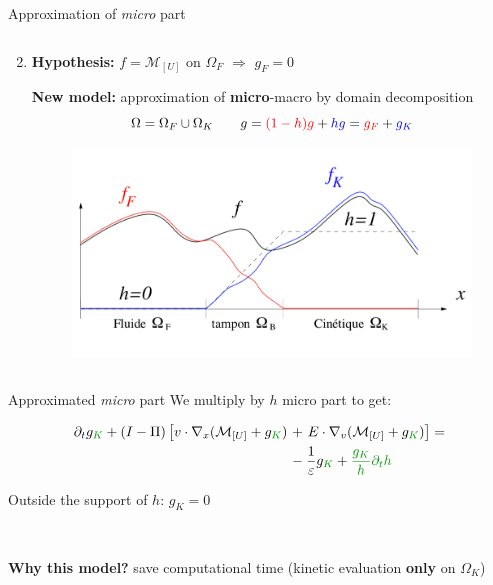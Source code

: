 \documentclass{beamer}
\begin{document}
  \begin{frame}{Approximation of \emph{micro} part}
    \begin{columns}
        \hspace*{0cm}
      \begin{column}{1.1\textwidth}
        \begin{enumerate}
          \setcounter{enumi}{1}
          \item \textbf{Hypothesis:} $f = \mathcal{M}_{[U]}$ on $\Omega_F$ $\Rightarrow$ $g_F = 0$

            \textbf{New model:} approximation of \textbf{micro}-macro by domain decomposition
            $$
              \Omega = \Omega_F \cup \Omega_K \qquad g = {\color{red}(1-h)g} + {\color{blue}hg} = {\color{red}g_F} + {\color{blue}g_K}
            $$

            \begin{figure}
              \centering
              \includegraphics[height=0.4\textheight]{img/hx.png}
            \end{figure}
        \end{enumerate}
      \end{column}
    \end{columns}  
  \end{frame}

  \begin{frame}{Approximated \emph{micro} part}
    We multiply by $h$ micro part to get:

    $$
      \begin{aligned}
        \partial_t g_{\color{dgreen}K} + (I-\Pi)\left[ v\cdot\nabla_x (\mathcal{M}_{[U]}+g_{\color{dgreen}K}) \right.&+\left. E\cdot\nabla_v (\mathcal{M}_{[U]}+g_{\color{dgreen}K}) \right] = \\
                                                                                      &-\frac{1}{\varepsilon}g_{\color{dgreen}K} + {\color{dgreen}\frac{g_K}{h}\partial_t h}
      \end{aligned}
    $$

    Outside the support of $h$: $g_K = 0$

    \ 

    \textbf{Why this model?} save computational time (kinetic evaluation \textbf{only} on $\Omega_K$)
  \end{frame}
\end{document}

